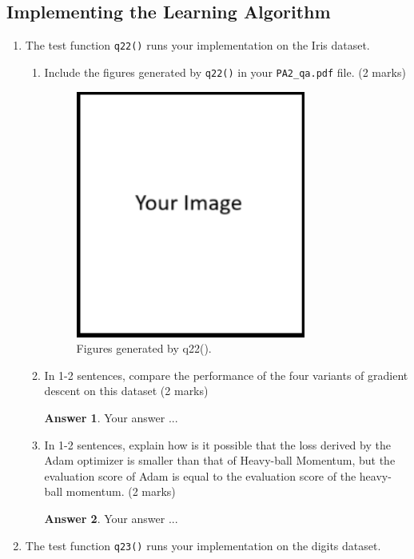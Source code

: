 \documentclass{article}
\theoremstyle{definition}
\newtheorem*{answer}{Answer}
\begin{document}
\subsection{Implementing the Learning Algorithm}\label{fit}
\begin{enumerate}[label=\ref{fit}.\alph*]
	\item The test function \verb|q22()| runs your implementation on the Iris dataset.
	\begin{enumerate}[label=2.2.a.\roman*]
		\item Include the figures generated by \verb|q22()| in your \verb|PA2_qa.pdf| file. (2 marks)
		\begin{figure}[h]
			\centering
			\includegraphics[height=3.2in]{image.png}
			\caption{Figures generated by q22().}
		\end{figure}
		\item In 1-2 sentences, compare the performance of the four variants of gradient descent on this dataset (2 marks)
		\begin{answer}
			Your answer ...
		\end{answer}
		\item In 1-2 sentences, explain how is it possible that the loss derived by the Adam optimizer is smaller than that of Heavy-ball Momentum, but the evaluation score of Adam is equal to the evaluation score of the heavy-ball momentum. (2 marks)
		\begin{answer}
			Your answer ...
		\end{answer}
	\end{enumerate}
	\newpage
	\item The test function \verb|q23()| runs your implementation on the digits dataset.
	\begin{enumerate}[label=2.2.b.\roman*]

\end{enumerate}
\end{enumerate}
\end{document}
